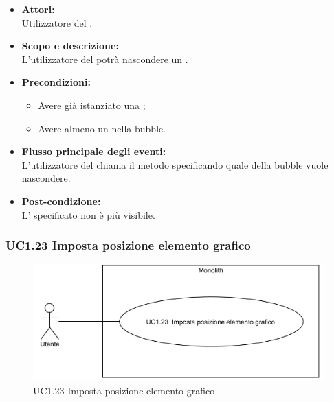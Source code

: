\begin{itemize}
	\item \textbf{Attori:}
	\\Utilizzatore del .
	\item \textbf{Scopo e descrizione:} 
	\\L’utilizzatore del  potrà nascondere un .
	\item \textbf{Precondizioni:}
	\begin{itemize}
		\item Avere già istanziato una ;
		\item Avere almeno un  nella bubble.
	\end{itemize}
	\item \textbf{Flusso principale degli eventi:}
	\\L’utilizzatore del  chiama il metodo specificando quale  della bubble vuole nascondere.
	\item \textbf{Post-condizione:}
	\\L' specificato non è più visibile.
\end{itemize}

\subsubsection{UC1.23 Imposta posizione elemento grafico} \label{UC1.23}

\begin{figure}[H]
	\centering
	\includegraphics[width=15cm]{../../documenti/AnalisiDeiRequisiti/Diagrammi_img/uc1_23.png}
	\caption{UC1.23 Imposta posizione elemento grafico}
\end{figure}

